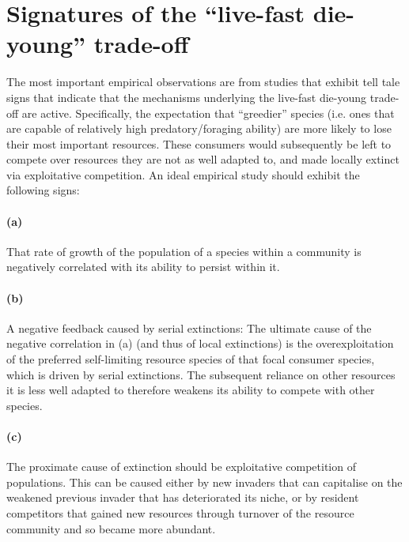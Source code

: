 \documentclass[a4paper]{report}
\begin{document}
\section{Signatures of the “live-fast die-young” trade-off \label{sec:signatures}}

The most important empirical observations are from studies that exhibit tell tale signs that indicate that the mechanisms underlying the live-fast die-young trade-off are active. Specifically, the expectation that “greedier” species (i.e. ones that are capable of relatively high predatory/foraging ability) are more likely to lose their most important resources. These consumers would subsequently be left to compete over resources they are not as well adapted to, and made locally extinct via exploitative competition. An ideal empirical study should exhibit the following signs:\\



\paragraph{(a)} That rate of growth of the population of a species within a community is negatively correlated with its ability to persist within it.\\

\paragraph{(b)} A negative feedback caused by serial extinctions: The ultimate cause of the negative correlation in (a) (and thus of local extinctions) is the overexploitation of the preferred self-limiting resource species of that focal consumer species, which is driven by serial extinctions. The subsequent reliance on other resources it is less well adapted to therefore weakens its ability to compete with other species.\\

\paragraph{(c)} The proximate cause of extinction should be exploitative competition of populations. This can be caused either by new invaders that can capitalise on the weakened previous invader that has deteriorated its niche, or by resident competitors that gained new resources through turnover of the resource community and so became more abundant.\\
\end{document}
